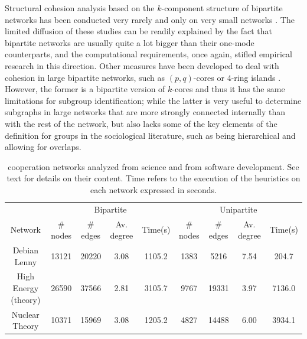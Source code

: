 Structural cohesion analysis based on the $k$-component structure of bipartite networks has been conducted very rarely and only on very small networks \citep{white:2004}. The limited diffusion of these studies can be readily explained by the fact that bipartite networks are usually quite a lot bigger than their one-mode counterparts, and the computational requirements, once again, stifled empirical research in this direction. Other measures have been developed to deal with cohesion in large bipartite networks, such as $(p, q)$-cores or 4-ring islands \citep{ahmed:2007}. However, the former is a bipartite version of $k$-cores and thus it has the same limitations for subgroup identification; while the latter is very useful to determine subgraphs in large networks that are more strongly connected internally than with the rest of the network, but also lacks some of the key elements of the definition for groups in the sociological literature, such as being hierarchical and allowing for overlaps.

\begin{table}[h]
\begin{center}
\begin{footnotesize}
\begin{tabular}{|c|c|c|c|c|c|c|c|c|}
\hline
&\multicolumn{4}{|c|}{Bipartite}&\multicolumn{4}{|c|}{Unipartite}\\
Network&\# nodes&\# edges&Av. degree&Time(s)&\# nodes&\# edges&Av. degree&Time(s)\\
\hline
Debian Lenny&13121&20220&3.08&1105.2&1383&5216&7.54&204.7\\
High Energy (theory)&26590&37566&2.81&3105.7&9767&19331&3.97&7136.0\\
Nuclear Theory&10371&15969&3.08&1205.2&4827&14488&6.00&3934.1\\
\hline
\end{tabular}
\end{footnotesize}
\caption[Example cooperation networks description.]{cooperation networks analyzed from science and from software development. See text for details on their content. Time refers to the execution of the heuristics on each network expressed in seconds.}
\label{desc}
\end{center}
\end{table}

